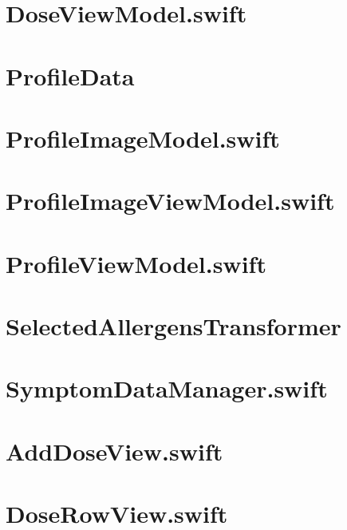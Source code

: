 \section{DoseViewModel.swift}


\section{ProfileData}


\section{ProfileImageModel.swift}


\section{ProfileImageViewModel.swift}


\section{ProfileViewModel.swift}


\section{SelectedAllergensTransformer}


\section{SymptomDataManager.swift}


\section{AddDoseView.swift}


\section{DoseRowView.swift}


